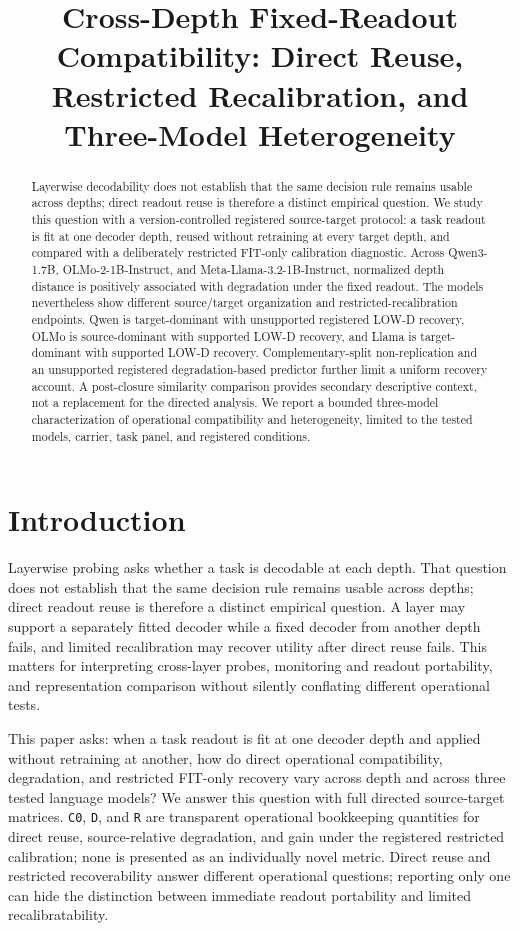 \documentclass{article}
\title{Cross-Depth Fixed-Readout Compatibility: Direct Reuse, Restricted Recalibration, and Three-Model Heterogeneity}
\author{}
\begin{document}
\maketitle

\begin{abstract}
Layerwise decodability does not establish that the same decision rule remains usable across depths; direct readout reuse is therefore a distinct empirical question. We study this question with a version-controlled registered source-target protocol: a task readout is fit at one decoder depth, reused without retraining at every target depth, and compared with a deliberately restricted FIT-only calibration diagnostic. Across Qwen3-1.7B, OLMo-2-1B-Instruct, and Meta-Llama-3.2-1B-Instruct, normalized depth distance is positively associated with degradation under the fixed readout. The models nevertheless show different source/target organization and restricted-recalibration endpoints. Qwen is target-dominant with unsupported registered LOW-D recovery, OLMo is source-dominant with supported LOW-D recovery, and Llama is target-dominant with supported LOW-D recovery. Complementary-split non-replication and an unsupported registered degradation-based predictor further limit a uniform recovery account. A post-closure similarity comparison provides secondary descriptive context, not a replacement for the directed analysis. We report a bounded three-model characterization of operational compatibility and heterogeneity, limited to the tested models, carrier, task panel, and registered conditions.
\end{abstract}

\section{Introduction}
Layerwise probing asks whether a task is decodable at each depth. That question does not establish that the same decision rule remains usable across depths; direct readout reuse is therefore a distinct empirical question. A layer may support a separately fitted decoder while a fixed decoder from another depth fails, and limited recalibration may recover utility after direct reuse fails. This matters for interpreting cross-layer probes, monitoring and readout portability, and representation comparison without silently conflating different operational tests.

This paper asks: when a task readout is fit at one decoder depth and applied without retraining at another, how do direct operational compatibility, degradation, and restricted FIT-only recovery vary across depth and across three tested language models? We answer this question with full directed source-target matrices. \texttt{C0}, \texttt{D}, and \texttt{R} are transparent operational bookkeeping quantities for direct reuse, source-relative degradation, and gain under the registered restricted calibration; none is presented as an individually novel metric. Direct reuse and restricted recoverability answer different operational questions; reporting only one can hide the distinction between immediate readout portability and limited recalibratability.
\end{document}
